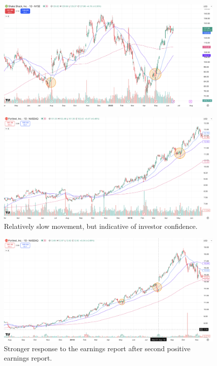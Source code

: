 \documentclass[11pt]{article}
\begin{document}
    \begin{figure}[H]
        \centering
        \includegraphics[width=1.0\linewidth]{images/SHAK2.png}
        \caption{}
        \label{fig:SHAK2}
    \end{figure}

    \begin{figure}[H]
        \centering
        \includegraphics[width=1.0\linewidth]{images/FTNT1.png}
        \caption{Relatively slow movement, but indicative of investor confidence.}
        \label{fig:FTNT1}
    \end{figure}

    \begin{figure}[H]
        \centering
        \includegraphics[width=1.0\linewidth]{images/FTNT2.png}
        \caption{Stronger response to the earnings report after second positive earnings report.}
        \label{fig:FTNT2}
    \end{figure}
\end{document}
